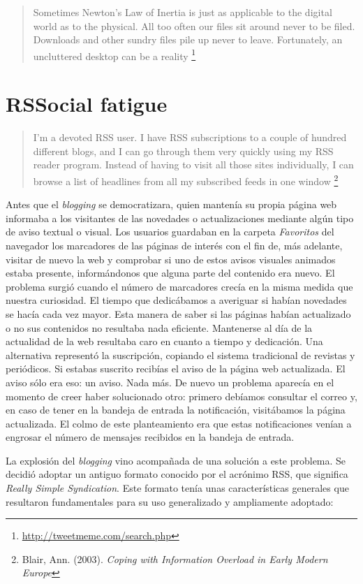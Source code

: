 \documentclass[12pt, a4paper,twoside]{book}
\newcommand{\chap}[1]{\newpage\thispagestyle{empty}\chapter{#1}\label{chap:\thechapter}}
\begin{document}
\begin{quote}
Sometimes Newton's Law of Inertia is just as applicable to the
digital world as to the physical. All too often our files sit
around never to be filed. Downloads and other sundry files pile up
never to leave. Fortunately, an uncluttered desktop can be a
reality%
\footnote{\href{http://tweetmeme.com/search.php}{http://tweetmeme.com/search.php}}

\end{quote}
\chap{RSSocial fatigue}

\begin{quote}
I'm a devoted RSS user. I have RSS subscriptions to a couple of
hundred different blogs, and I can go through them very quickly
using my RSS reader program. Instead of having to visit all those
sites individually, I can browse a list of headlines from all my
subscribed feeds in one window%
\footnote{Blair, Ann. (2003).
\emph{Coping with Information Overload in Early Modern Europe}}

\end{quote}
Antes que el \emph{blogging} se democratizara, quien mantenía su
propia página web informaba a los visitantes de las novedades o
actualizaciones mediante algún tipo de aviso textual o visual. Los
usuarios guardaban en la carpeta \emph{Favoritos} del navegador los
marcadores de las páginas de interés con el fin de, más adelante,
visitar de nuevo la web y comprobar si uno de estos avisos visuales
animados estaba presente, informándonos que alguna parte del
contenido era nuevo. El problema surgió cuando el número de
marcadores crecía en la misma medida que nuestra curiosidad. El
tiempo que dedicábamos a averiguar si habían novedades se hacía
cada vez mayor. Esta manera de saber si las páginas habían
actualizado o no sus contenidos no resultaba nada eficiente.
Mantenerse al día de la actualidad de la web resultaba caro en
cuanto a tiempo y dedicación. Una alternativa representó la
suscripción, copiando el sistema tradicional de revistas y
periódicos. Si estabas suscrito recibías el aviso de la página web
actualizada. El aviso sólo era eso: un aviso. Nada más. De nuevo un
problema aparecía en el momento de creer haber solucionado otro:
primero debíamos consultar el correo y, en caso de tener en la
bandeja de entrada la notificación, visitábamos la página
actualizada. El colmo de este planteamiento era que estas
notificaciones venían a engrosar el número de mensajes recibidos en
la bandeja de entrada.

La explosión del \emph{blogging} vino acompañada de una solución a
este problema. Se decidió adoptar un antiguo formato conocido por
el acrónimo RSS, que significa \emph{Really Simple Syndication}.
Este formato tenía unas características generales que resultaron
fundamentales para su uso generalizado y ampliamente adoptado:
\end{document}
